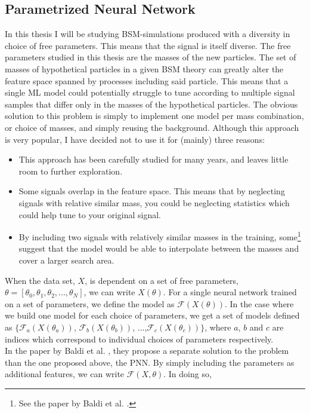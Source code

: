 \subsection{Parametrized Neural Network}\label{subsec:PNN}
In this thesis I will be studying \ac{BSM}-simulations produced with a diversity in choice of free parameters. This
means that the signal is itself diverse. The free parameters studied in this thesis are the masses of the
new particles. The set of masses of hypothetical particles in a given \ac{BSM} theory can greatly alter the feature space
spanned by processes including said particle. This means that a single \ac{ML} model could potentially struggle to tune 
according to multiple signal samples that differ only in the masses of the hypothetical particles. The obvious solution to 
this problem is simply to implement one model per mass combination, or choice of masses, and simply reusing the background. 
Although this approach is very popular, I have decided not to use it for (mainly) three reasons:
\begin{itemize}
    \item This approach has been carefully studied for many years, and leaves little room to further exploration. 
    \item Some signals overlap in the feature space. This means that by neglecting signals with relative 
          similar mass, you could be neglecting statistics which could help tune to your original signal. 
    \item By including two signals with relatively similar masses in the training, some\footnote{See the paper by Baldi et al. \cite{PNN}.} 
          suggest that the model would be able to interpolate between the masses and cover a larger search area.
\end{itemize}
When the data set, $X$, is dependent on a set of free parameters, $\theta = [\theta_0,\theta_1,\theta_2,...,\theta_N]$,
we can write $X(\theta)$. For a single neural network trained on a set of parameters, we define the model as 
$\mathcal{F}(X(\theta))$. In the case where we build one model for each choice of parameters, we get a set of models
defined as $\{ \mathcal{F}_a(X(\theta_a))$, $\mathcal{F}_b(X(\theta_b))$, ...,$\mathcal{F}_c(X(\theta_c))\}$, where
$a$, $b$ and $c$ are indices which correspond to individual choices of parameters respectively. 
\\
In the paper by Baldi et al. \cite{PNN}, they propose a separate solution to the problem than the one proposed above, the \acf{PNN}. 
By simply including the parameters as additional features, we can write $\mathcal{F}(X, \theta)$. In doing so, 
